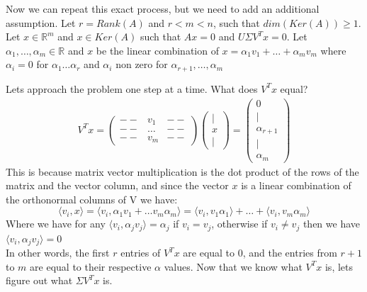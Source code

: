 \documentclass[12pt,twoside]{article}
\newcommand{\R}{\mathbb{R}}
\begin{document}
Now we can repeat this exact process, but we need to add an additional assumption. Let $r=Rank(A)$ and $r < m < n $, such that $dim(Ker(A)) \geq 1$. Let $x\in \R^m$ and $x\in Ker(A)$ such that $Ax = 0$ and $U\Sigma V^T x = 0$. Let $\alpha_1, \dots, \alpha_m \in \R$ and $x$ be the linear combination of $x= \alpha_1 v_1 + \dots + \alpha_m v_m$ where $\alpha_i=0$ for $\alpha_1 \dots \alpha_r$ and $\alpha_i$ non zero for $\alpha_{r+1}, \dots, \alpha_m$

Lets approach the problem one step at a time. What does $V^Tx$ equal?
\begin{equation}
    \begin{split}
        V^Tx = \begin{pmatrix}
					-- & v_1 & -- \\
					-- & \dots & -- \\
					-- & v_m & --  
			\end{pmatrix}\begin{pmatrix}
			| \\
					x \\
					|
			\end{pmatrix} = \begin{pmatrix}
			0 \\
			| \\
			\alpha_{r+1} \\
			| \\
			\alpha_m
			\end{pmatrix}
    \end{split}
\end{equation}
This is because matrix vector multiplication is the dot product of the rows of the matrix and the vector column, and since the vector $x$ is a linear combination of the orthonormal columns of V we have:
$$
    \langle v_i, x \rangle = \langle v_i, \alpha_1 v_1 + \dots v_m\alpha_m \rangle = \langle v_i, v_1\alpha_1 \rangle + \dots + \langle v_i, v_m\alpha_m \rangle $$
Where we have for any $\langle v_i, \alpha_jv_j \rangle = \alpha_j$ if $v_i=v_j$, otherwise if $v_i \neq v_j$ then we have $\langle v_i, \alpha_jv_j \rangle =0$\\

In other words, the first $r$ entries of $V^Tx$ are equal to 0, and the entries from $r+1$ to $m$ are equal to their respective $\alpha$ values. Now that we know what $V^Tx$ is, lets figure out what $\Sigma V^Tx$ is.\\
\end{document}
